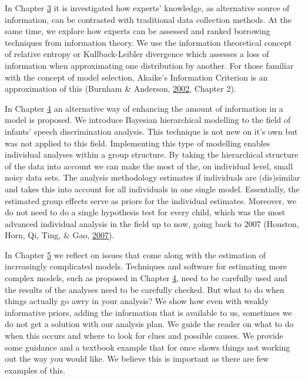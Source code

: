\documentclass[openright,titlepage,12pt,a4paper]{book}
\begin{document}
In Chapter \protect\hyperlink{DAC1}{3} it is investigated how experts' knowledge, as alternative source of information, can be contrasted with traditional data collection methods. At the same time, we explore how experts can be assessed and ranked borrowing techniques from information theory. We use the information theoretical concept of relative entropy or Kullback-Leibler divergence which assesses a loss of information when approximating one distribution by another. For those familiar with the concept of model selection, Akaike's Information Criterion is an approximation of this (Burnham \& Anderson, \protect\hyperlink{ref-burnham_model_2002}{2002}, Chapter 2).

In Chapter \protect\hyperlink{Hierarchical}{4} an alternative way of enhancing the amount of information in a model is proposed. We introduce Bayesian hierarchical modelling to the field of infants' speech discrimination analysis. This technique is not new on it's own but was not applied to this field. Implementing this type of modelling enables individual analyses within a group structure. By taking the hierarchical structure of the data into account we can make the most of the, on individual level, small noisy data sets. The analysis methodology estimates if individuals are (dis)similar and takes this into account for all individuals in one single model. Essentially, the estimated group effects serve as priors for the individual estimates. Moreover, we do not need to do a single hypothesis test for every child, which was the most advanced individual analysis in the field up to now, going back to 2007 (Houston, Horn, Qi, Ting, \& Gao, \protect\hyperlink{ref-houston_assessing_2007}{2007}).

In Chapter \protect\hyperlink{Burns}{5} we reflect on issues that come along with the estimation of increasingly complicated models. Techniques and software for estimating more complex models, such as proposed in Chapter \protect\hyperlink{Hierarchical}{4}, need to be carefully used and the results of the analyses need to be carefully checked. But what to do when things actually go awry in your analysis? We show how even with weakly informative priors, adding the information that is available to us, sometimes we do not get a solution with our analysis plan. We guide the reader on what to do when this occurs and where to look for clues and possible causes. We provide some guidance and a textbook example that for once shows things not working out the way you would like. We believe this is important as there are few examples of this.
\end{document}
